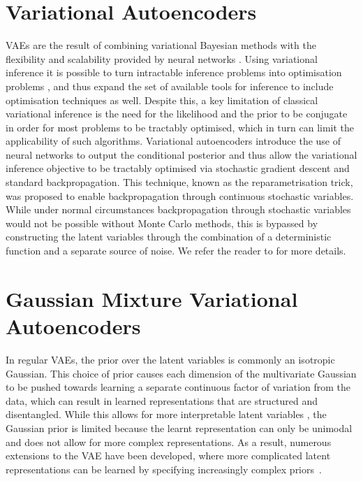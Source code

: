 \documentclass{article} \usepackage{iclr2017_conference,times}
\begin{document}
\section{Variational Autoencoders}
\label{vae}

VAEs are the result of combining variational Bayesian methods with the flexibility and scalability provided by neural networks \citep{kingma2013auto, rezende2014stochastic}. Using variational inference it is possible to turn intractable inference problems into optimisation problems \citep{wainwright2008graphical}, and thus expand the set of available tools for inference to include optimisation techniques as well. Despite this, a key limitation of classical variational inference is the need for the likelihood and the prior to be conjugate in order for most problems to be tractably optimised, which in turn can limit the applicability of such algorithms. Variational autoencoders introduce the use of neural networks to output the conditional posterior \citep{kingma2013auto} and thus allow the variational inference objective to be tractably optimised via stochastic gradient descent and standard backpropagation. This technique, known as the reparametrisation trick, was proposed to enable backpropagation through continuous stochastic variables. While under normal circumstances backpropagation through stochastic variables would not be possible without Monte Carlo methods, this is bypassed by constructing the latent variables through the combination of a deterministic function and a separate source of noise. We refer the reader to \cite{kingma2013auto} for more details.

\section{Gaussian Mixture Variational Autoencoders}
\label{sec:gmvae}

In regular VAEs, the prior over the latent variables is commonly an isotropic Gaussian. This choice of prior causes each dimension of the multivariate Gaussian to be pushed towards learning a separate continuous factor of variation from the data, which can result in learned representations that are structured and disentangled. While this allows for more interpretable latent variables \citep{higgins2016early}, the Gaussian prior is limited because the learnt representation can only be unimodal and does not allow for more complex representations. As a result, numerous extensions to the VAE have been developed, where more complicated latent representations can be learned by specifying increasingly complex priors~\citep{chung2015arecurrent, gregor2015draw, eslami2016attend}.
\end{document}
